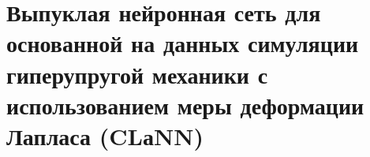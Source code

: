 \documentclass[12pt,a4paper]{report}
\numberwithin{equation}{chapter}
\begin{document}
% 

% 

% 

% 

\tableofcontents
\newpage

% 
\chapter{Выпуклая нейронная сеть для основанной на данных симуляции гиперупругой механики с использованием меры деформации Лапласа (CLаNN)}








% 

\renewcommand{\bibname}{Список литературы}

\end{document}
